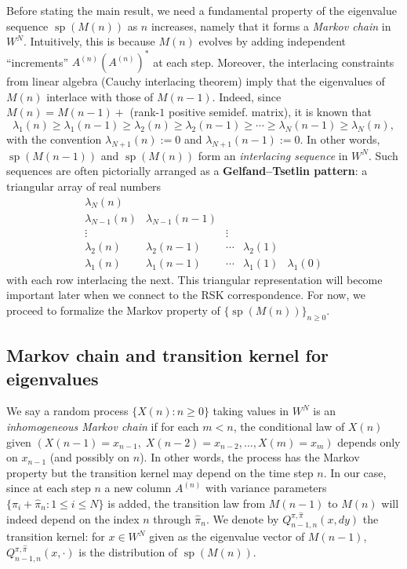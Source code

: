 \documentclass[letterpaper,11pt,oneside,reqno]{article}
\numberwithin{equation}{section}
\theoremstyle{definition}
\begin{document}
Before stating the main result, we need a fundamental property of the eigenvalue sequence $\operatorname{sp}(M(n))$ as $n$ increases, namely that it forms a \emph{Markov chain} in $W^N$. Intuitively, this is because $M(n)$ evolves by adding independent ``increments'' $A^{(n)}(A^{(n)})^*$ at each step. Moreover, the interlacing constraints from linear algebra (Cauchy interlacing theorem) imply that the eigenvalues of $M(n)$ interlace with those of $M(n-1)$. Indeed, since $M(n) = M(n-1) +$ (rank-$1$ positive semidef. matrix), it is known that
\begin{equation}\label{eq:interlace}
\lambda_1(n) \ge \lambda_1(n-1) \ge \lambda_2(n) \ge \lambda_2(n-1) \ge \cdots \ge \lambda_N(n-1) \ge \lambda_N(n),
\end{equation}
with the convention $\lambda_{N+1}(n) := 0$ and $\lambda_{N+1}(n-1):=0$. In other words, $\operatorname{sp}(M(n-1))$ and $\operatorname{sp}(M(n))$ form an \emph{interlacing sequence} in $W^N$. Such sequences are often pictorially arranged as a \textbf{Gelfand--Tsetlin pattern}: a triangular array of real numbers
\[
\begin{matrix}
\lambda_N(n) \\
\lambda_{N-1}(n) & \lambda_{N-1}(n-1) \\
\vdots & & \vdots \\
\lambda_{2}(n) & \lambda_{2}(n-1) & \cdots & \lambda_{2}(1)\\
\lambda_{1}(n) & \lambda_{1}(n-1) & \cdots & \lambda_{1}(1) & \lambda_{1}(0)
\end{matrix}
\]
with each row interlacing the next. This triangular representation will become important later when we connect to the RSK correspondence. For now, we proceed to formalize the Markov property of $\{\operatorname{sp}(M(n))\}_{n\ge0}$.

\subsection{Markov chain and transition kernel for eigenvalues}
We say a random process $\{X(n):n\ge0\}$ taking values in $W^N$ is an \emph{inhomogeneous Markov chain} if for each $m<n$, the conditional law of $X(n)$ given $(X(n-1)=x_{n-1},\;X(n-2)=x_{n-2},\dots,X(m)=x_m)$ depends only on $x_{n-1}$ (and possibly on $n$). In other words, the process has the Markov property but the transition kernel may depend on the time step $n$. In our case, since at each step $n$ a new column $A^{(n)}$ with variance parameters $\{\pi_i+\hat\pi_n:1\le i\le N\}$ is added, the transition law from $M(n-1)$ to $M(n)$ will indeed depend on the index $n$ through $\hat\pi_n$. We denote by $Q^{\pi,\hat\pi}_{n-1,n}(x,dy)$ the transition kernel: for $x\in W^N$ given as the eigenvalue vector of $M(n-1)$, $Q^{\pi,\hat\pi}_{n-1,n}(x,\cdot)$ is the distribution of $\operatorname{sp}(M(n))$.
\end{document}
